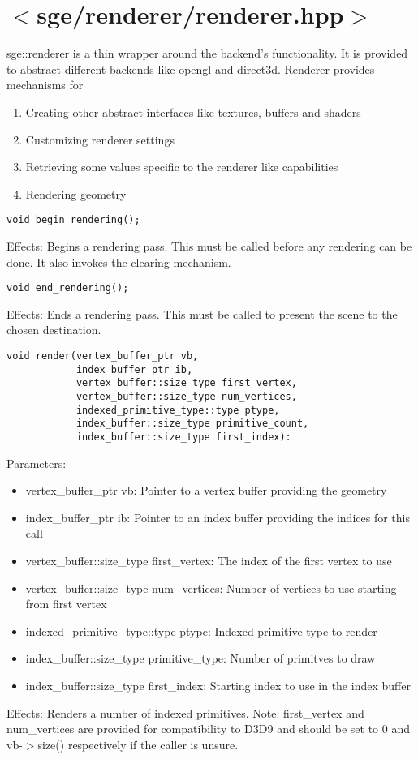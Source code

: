 \documentclass{article}
\begin{document}
\lstset{language=C++}

\section{$<$sge/renderer/renderer.hpp$>$}

sge::renderer is a thin wrapper around the backend's functionality.
It is provided to abstract different backends like opengl and direct3d.
Renderer provides mechanisms for
\begin{enumerate}
\item{Creating other abstract interfaces like textures, buffers and shaders}
\item{Customizing renderer settings}
\item{Retrieving some values specific to the renderer like capabilities}
\item{Rendering geometry}
\end{enumerate}

\begin{lstlisting}
void begin_rendering();
\end{lstlisting}
Effects: Begins a rendering pass.
This must be called before any rendering can be done.
It also invokes the clearing mechanism.

\begin{lstlisting}
void end_rendering();
\end{lstlisting}
Effects: Ends a rendering pass.
This must be called to present the scene to the chosen destination.

\begin{lstlisting}
void render(vertex_buffer_ptr vb,
            index_buffer_ptr ib,
            vertex_buffer::size_type first_vertex,
            vertex_buffer::size_type num_vertices,
            indexed_primitive_type::type ptype,
            index_buffer::size_type primitive_count,
            index_buffer::size_type first_index):
\end{lstlisting}
Parameters:
\begin{itemize}
\item vertex\_buffer\_ptr vb: Pointer to a vertex buffer providing the geometry
\item index\_buffer\_ptr ib: Pointer to an index buffer providing the indices for this call
\item vertex\_buffer::size\_type first\_vertex: The index of the first vertex to use
\item vertex\_buffer::size\_type num\_vertices: Number of vertices to use starting from first vertex
\item indexed\_primitive\_type::type ptype: Indexed primitive type to render
\item index\_buffer::size\_type primitive\_type: Number of primitves to draw
\item index\_buffer::size\_type first\_index: Starting index to use in the index buffer
\end{itemize}
Effects: Renders a number of indexed primitives.
Note: first\_vertex and num\_vertices are provided for compatibility to D3D9 and should be set to 0 and vb-$>$size() respectively if the caller is unsure.
\end{document}
